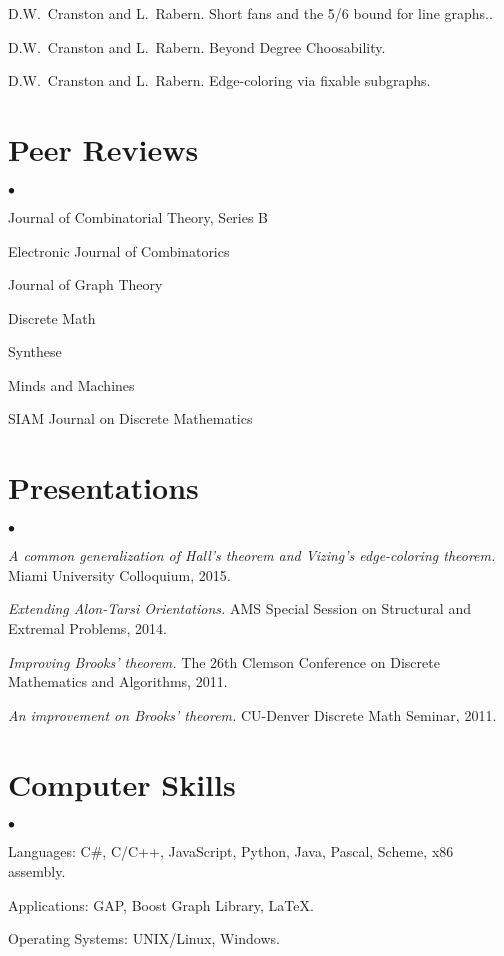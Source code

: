 \documentclass[margin,line]{res}
\newenvironment{list2}{
  \begin{list}{$\bullet$}{%
      \setlength{\itemsep}{0in}
      \setlength{\parsep}{0in} \setlength{\parskip}{0in}
      \setlength{\topsep}{0in} \setlength{\partopsep}{0in} 
      \setlength{\leftmargin}{0.2in}}}{\end{list}}
\begin{document}
\begin{resume}
\begin{enumerate}[{[}1{]}]
\smallskip

\item
D.W.~Cranston and L.~Rabern.
\newblock Short fans and the 5/6 bound for line graphs..

\smallskip

\item
D.W.~Cranston and L.~Rabern.
\newblock Beyond Degree Choosability.

\smallskip

\item
D.W.~Cranston and L.~Rabern.
\newblock Edge-coloring via fixable subgraphs.


\end{enumerate}

\section{\sc Peer Reviews}
\begin{list2}
\item Journal of Combinatorial Theory, Series B
\item Electronic Journal of Combinatorics
\item Journal of Graph Theory
\item Discrete Math
\item Synthese
\item Minds and Machines
\item SIAM Journal on Discrete Mathematics
\end{list2}

\section{\sc Presentations}
\begin{list2}
\item \emph{A common generalization of Hall's theorem and Vizing's edge-coloring theorem.} Miami University Colloquium, 2015.
\item \emph{Extending Alon-Tarsi Orientations.} AMS Special Session on Structural and Extremal Problems, 2014.
\item \emph{Improving Brooks' theorem.} The 26th Clemson Conference on Discrete Mathematics and Algorithms, 2011.
\item \emph{An improvement on Brooks' theorem.} CU-Denver Discrete Math Seminar, 2011.
\end{list2}

\section{\sc Computer Skills} 
\begin{list2}
\item Languages: C\#, C/C++, JavaScript, Python, Java, Pascal, Scheme, x86 assembly.
\item Applications: GAP, Boost Graph Library, \LaTeX.
\item Operating Systems:  UNIX/Linux, Windows.
\end{list2}

\end{resume}
\end{document}
